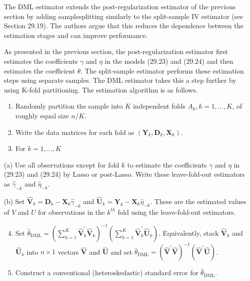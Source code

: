 \documentclass[10pt]{article}
\begin{document}
The DML estimator extends the post-regularization estimator of the previous section by adding samplesplitting similarly to the split-sample IV estimator (see Section 29.19). The authors argue that this reduces the dependence between the estimation stages and can improve performance.

As presented in the previous section, the post-regularization estimator first estimates the coefficients $\gamma$ and $\eta$ in the models (29.23) and (29.24) and then estimates the coefficient $\theta$. The split-sample estimator performs these estimation steps using separate samples. The DML estimator takes this a step further by using K-fold partitioning. The estimation algorithm is as follows.

\begin{enumerate}
  \item Randomly partition the sample into $K$ independent folds $A_{k}, k=1, \ldots, K$, of roughly equal size $n / K$.

  \item Write the data matrices for each fold as $\left(\boldsymbol{Y}_{k}, \boldsymbol{D}_{k}, \boldsymbol{X}_{k}\right)$.

  \item For $k=1, \ldots, K$

\end{enumerate}

(a) Use all observations except for fold $k$ to estimate the coefficients $\gamma$ and $\eta$ in (29.23) and (29.24) by Lasso or post-Lasso. Write these leave-fold-out estimators as $\widehat{\gamma}_{-k}$ and $\widehat{\eta}_{-k}$.

(b) Set $\widehat{\boldsymbol{V}}_{k}=\boldsymbol{D}_{k}-\boldsymbol{X}_{k} \widehat{\gamma}_{-k}$ and $\widehat{\boldsymbol{U}}_{k}=\boldsymbol{Y}_{k}-\boldsymbol{X}_{k} \widehat{\eta}_{-k}$. These are the estimated values of $V$ and $U$ for observations in the $k^{t h}$ fold using the leave-fold-out estimators.

\begin{enumerate}
  \setcounter{enumi}{3}
  \item Set $\widehat{\theta}_{\mathrm{DML}}=\left(\sum_{k=1}^{K} \widehat{\boldsymbol{V}}_{k}^{\prime} \widehat{\boldsymbol{V}}_{k}\right)^{-1}\left(\sum_{k=1}^{K} \widehat{\boldsymbol{V}}_{k}^{\prime} \widehat{\boldsymbol{U}}_{k}\right)$. Equivalently, stack $\widehat{\boldsymbol{V}}_{k}$ and $\widehat{\boldsymbol{U}}_{k}$ into $n \times 1$ vectors $\widehat{\boldsymbol{V}}$ and $\widehat{\boldsymbol{U}}$ and set $\widehat{\theta}_{\mathrm{DML}}=\left(\widehat{\boldsymbol{V}}^{\prime} \widehat{\boldsymbol{V}}\right)^{-1}\left(\widehat{\boldsymbol{V}}^{\prime} \widehat{\boldsymbol{U}}\right)$.

  \item Construct a conventional (heteroskedastic) standard error for $\widehat{\theta}_{\mathrm{DML}}$.

\end{enumerate}
\end{document}
